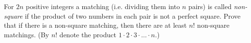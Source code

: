 For $2n$ positive integers a matching (i.e. dividing them into $n$ pairs) is called {\it non-square} if the product of two numbers in each pair is not a perfect square. Prove that if there is a non-square matching, then there are at least $n!$ non-square matchings.
(By $n!$ denote the product $1\cdot 2\cdot 3\cdot \ldots \cdot n$.)